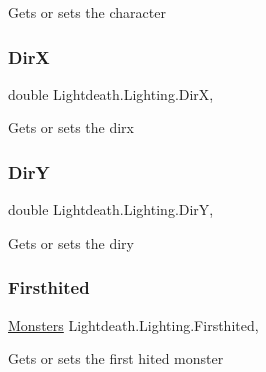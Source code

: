 Gets or sets the character 

\hypertarget{class_lightdeath_1_1_lighting_a22c0f43acec2e793bb2ea76a327f28d1}{}\label{class_lightdeath_1_1_lighting_a22c0f43acec2e793bb2ea76a327f28d1} 
\subsubsection{\texorpdfstring{DirX}{DirX}}
{\footnotesize\ttfamily double Lightdeath.\+Lighting.\+DirX\hspace{0.3cm}{\ttfamily [get]}, {\ttfamily [set]}}



Gets or sets the dirx 

\hypertarget{class_lightdeath_1_1_lighting_a374459abb5204827bd07c460e9384f51}{}\label{class_lightdeath_1_1_lighting_a374459abb5204827bd07c460e9384f51} 
\subsubsection{\texorpdfstring{DirY}{DirY}}
{\footnotesize\ttfamily double Lightdeath.\+Lighting.\+DirY\hspace{0.3cm}{\ttfamily [get]}, {\ttfamily [set]}}



Gets or sets the diry 

\hypertarget{class_lightdeath_1_1_lighting_aa5220bba3f66dde396c673ab0871e552}{}\label{class_lightdeath_1_1_lighting_aa5220bba3f66dde396c673ab0871e552} 
\subsubsection{\texorpdfstring{Firsthited}{Firsthited}}
{\footnotesize\ttfamily \hyperlink{class_lightdeath_1_1_monsters}{Monsters} Lightdeath.\+Lighting.\+Firsthited\hspace{0.3cm}{\ttfamily [get]}, {\ttfamily [set]}}



Gets or sets the first hited monster 

\hypertarget{class_lightdeath_1_1_lighting_afddbf150e79c46941e5c563126725464}{}\label{class_lightdeath_1_1_lighting_afddbf150e79c46941e5c563126725464} 
